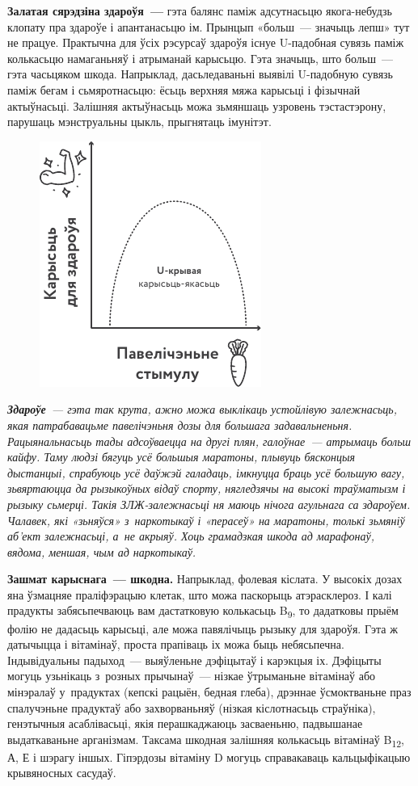 \textbf{Залатая сярэдзіна здароўя~---} гэта балянс паміж адсутнасьцю якога-небудзь клопату пра здароўе і апантанасьцю ім. Прынцып «больш~--- значыць лепш» тут не працуе. Практычна для ўсіх рэсурсаў здароўя існуе U-падобная сувязь паміж колькасьцю намаганьняў і атрыманай карысьцю. Гэта значыць, што больш~--- гэта часьцяком шкода. Напрыклад, дасьледаваньні выявілі U-падобную сувязь паміж бегам і сьмяротнасьцю: ёсьць верхняя мяжа карысьці і фізычнай актыўнасьці. Залішняя актыўнасьць можа зьмяншаць узровень тэстастэрону, парушаць мэнструальны цыкль, прыгнятаць імунітэт.

\begin{figure}[htb!]
  \centering
  \includegraphics[scale=1.5]{willpower/ch3/9.pdf}
\end{figure}

\emph{\textbf{Здароўе}~--- гэта так крута, ажно можа выклікаць устойлівую залежнасьць, якая патрабавацьме павелічэньня дозы для большага задавальненьня. Рацыянальнасьць тады адсоўваецца на другі плян, галоўнае~--- атрымаць больш кайфу. Таму людзі бягуць усё большыя маратоны, плывуць бясконцыя дыстанцыі, спрабуюць усё даўжэй галадаць, імкнуцца браць усё большую вагу, зьвяртаюцца да рызыкоўных відаў спорту, нягледзячы на высокі траўматызм і рызыку сьмерці. Такія ЗЛЖ-залежнасьці ня маюць нічога агульнага са здароўем. Чалавек, які «зьняўся» з~наркотыкаў і «перасеў» на маратоны, толькі зьмяніў аб'ект залежнасьці, а~не акрыяў. Хоць грамадзкая шкода ад марафонаў, вядома, меншая, чым ад наркотыкаў.}

\textbf{Зашмат карыснага~--- шкодна.} Напрыклад, фолевая кіслата. У высокіх дозах яна ўзмацняе праліфэрацыю клетак, што можа паскорыць атэрасклероз. І калі прадукты забясьпечваюць вам дастатковую колькасьць B\textsubscript{9}, то дадатковы прыём фолію не дадасьць карысьці, але можа павялічыць рызыку для здароўя. Гэта ж датычыцца і вітамінаў, проста прапіваць іх можа быць небясьпечна. Індывідуальны падыход~--- выяўленьне дэфіцытаў і карэкцыя іх. Дэфіцыты могуць узьнікаць з~розных прычынаў~--- нізкае ўтрыманьне вітамінаў або мінэралаў у~прадуктах (кепскі рацыён, бедная глеба), дрэннае ўсмоктваньне праз спалучэньне прадуктаў або захворваньняў (нізкая кіслотнасьць страўніка), генэтычныя асаблівасьці, якія перашкаджаюць засваеньню, падвышанае выдаткаваньне арганізмам. Таксама шкодная залішняя колькасьць вітамінаў B\textsubscript{12}, А, Е і шэрагу іншых. Гіпэрдозы вітаміну D могуць справакаваць кальцыфікацыю крывяносных сасудаў.


